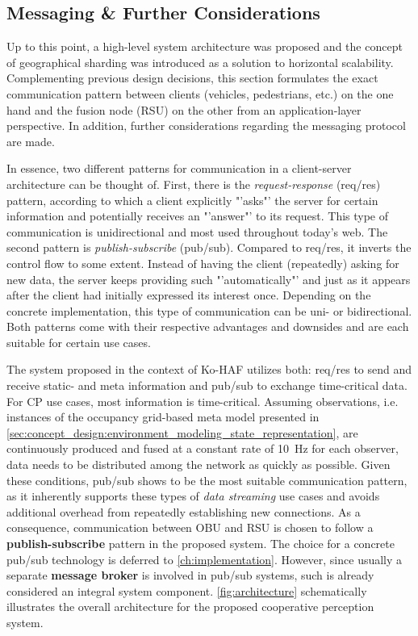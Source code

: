 \subsection{Messaging \& Further Considerations}
\label{subsec:concept_design:messaging_further_considerations}
Up to this point, a high-level system architecture was proposed and the concept of geographical sharding was introduced as a solution to horizontal scalability. Complementing previous design decisions, this section formulates the exact communication pattern between clients (vehicles, pedestrians, etc.) on the one hand and the fusion node (RSU) on the other from an application-layer perspective. In addition, further considerations regarding the messaging protocol are made.
\par
\bigskip

In essence, two different patterns for communication in a client-server architecture can be thought of. First, there is the \textit{request-response} (req/res) pattern, according to which a client explicitly "'asks"' the server for certain information and potentially receives an "'answer"' to its request. This type of communication is unidirectional and most used throughout today's web. The second pattern is \textit{publish-subscribe} (pub/sub). Compared to req/res, it inverts the control flow to some extent. Instead of having the client (repeatedly) asking for new data, the server keeps providing such "'automatically"' and just as it appears after the client had initially expressed its interest once. Depending on the concrete implementation, this type of communication can be uni- or bidirectional. Both patterns come with their respective advantages and downsides and are each suitable for certain use cases.

The system proposed in the context of Ko-HAF \cite{Hohm2019} utilizes both: req/res to send and receive static- and meta information and pub/sub to exchange time-critical data. For CP use cases, most information is time-critical. Assuming observations, i.e. instances of the occupancy grid-based meta model presented in \autoref{sec:concept_design:environment_modeling_state_representation}, are continuously produced and fused at a constant rate of \SI{10}{\hertz} for each observer, data needs to be distributed among the network as quickly as possible. Given these conditions, pub/sub shows to be the most suitable communication pattern, as it inherently supports these types of \textit{data streaming} use cases and avoids additional overhead from repeatedly establishing new connections. As a consequence, communication between OBU and RSU is chosen to follow a \textbf{publish-subscribe} pattern in the proposed system. The choice for a concrete pub/sub technology is deferred to \autoref{ch:implementation}. However, since usually a separate \textbf{message broker} is involved in pub/sub systems, such is already considered an integral system component. \autoref{fig:architecture} schematically illustrates the overall architecture for the proposed cooperative perception system.

